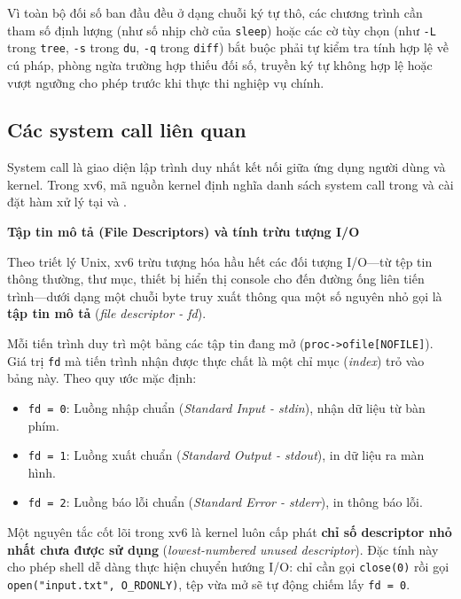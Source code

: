 \documentclass[12pt,a4paper]{article}
\begin{document}
Vì toàn bộ đối số ban đầu đều ở dạng chuỗi ký tự thô, các chương trình cần tham số định lượng (như số nhịp chờ của \texttt{sleep}) hoặc các cờ tùy chọn (như \texttt{-L} trong \texttt{tree}, \texttt{-s} trong \texttt{du}, \texttt{-q} trong \texttt{diff}) bắt buộc phải tự kiểm tra tính hợp lệ về cú pháp, phòng ngừa trường hợp thiếu đối số, truyền ký tự không hợp lệ hoặc vượt ngưỡng cho phép trước khi thực thi nghiệp vụ chính.

\subsection{Các system call liên quan}

System call là giao diện lập trình duy nhất kết nối giữa ứng dụng người dùng và kernel. Trong xv6, mã nguồn kernel định nghĩa danh sách system call trong  và cài đặt hàm xử lý tại  và .

\textbf{Tập tin mô tả (File Descriptors) và tính trừu tượng I/O}

Theo triết lý Unix, xv6 trừu tượng hóa hầu hết các đối tượng I/O---từ tệp tin thông thường, thư mục, thiết bị hiển thị console cho đến đường ống liên tiến trình---dưới dạng một chuỗi byte truy xuất thông qua một số nguyên nhỏ gọi là \textbf{tập tin mô tả} (\textit{file descriptor - fd}).

Mỗi tiến trình duy trì một bảng các tập tin đang mở (\texttt{proc->ofile[NOFILE]}). Giá trị \texttt{fd} mà tiến trình nhận được thực chất là một chỉ mục (\textit{index}) trỏ vào bảng này. Theo quy ước mặc định:
\begin{itemize}
  \item \texttt{fd = 0}: Luồng nhập chuẩn (\textit{Standard Input - stdin}), nhận dữ liệu từ bàn phím.
  \item \texttt{fd = 1}: Luồng xuất chuẩn (\textit{Standard Output - stdout}), in dữ liệu ra màn hình.
  \item \texttt{fd = 2}: Luồng báo lỗi chuẩn (\textit{Standard Error - stderr}), in thông báo lỗi.
\end{itemize}

Một nguyên tắc cốt lõi trong xv6 là kernel luôn cấp phát \textbf{chỉ số descriptor nhỏ nhất chưa được sử dụng} (\textit{lowest-numbered unused descriptor}). Đặc tính này cho phép shell dễ dàng thực hiện chuyển hướng I/O: chỉ cần gọi \texttt{close(0)} rồi gọi \texttt{open("input.txt", O\_RDONLY)}, tệp vừa mở sẽ tự động chiếm lấy \texttt{fd = 0}.
\end{document}

